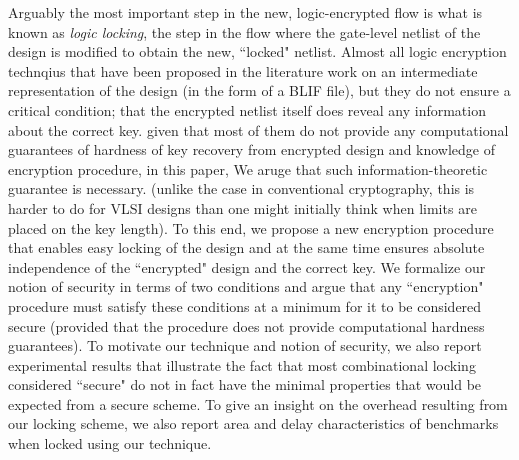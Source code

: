 

Arguably the most important step in the new, logic-encrypted flow is what is known as \emph{logic locking}, the step in the flow where the gate-level netlist of the design is modified to obtain the new, ``locked" netlist. Almost all logic encryption technqius that have been proposed in the literature work on an intermediate representation of the design (in the form of a BLIF file), but they do not ensure a critical condition; that the encrypted netlist itself does reveal any information about the correct key. given that most of them do not provide any computational guarantees of hardness of key recovery from encrypted design and knowledge of encryption procedure, in this paper, We aruge that such information-theoretic guarantee is necessary. (unlike the case in conventional cryptography, this is harder to do for VLSI designs than one might initially think %
when limits are placed on the key length). To this end, we propose a new encryption procedure that enables easy locking of the design and at the same time ensures absolute independence of the ``encrypted" design and the correct key. We formalize our notion of security in terms of two conditions and argue that any ``encryption" procedure must satisfy these conditions at a minimum for it to be considered secure (provided that the procedure does not provide computational hardness guarantees). To motivate our technique and notion of security, we also report experimental results that illustrate the fact that most combinational locking considered ``secure" do not in fact have the minimal properties that would be expected from a secure scheme. To give an insight on the overhead resulting from our locking scheme, we also report area and delay characteristics of benchmarks when locked using our technique.

